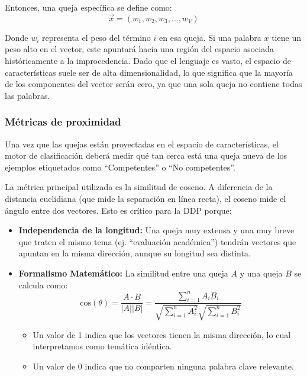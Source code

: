 Entonces, una queja específica se define como:
\begin{equation}
\vec{x} = (w_1, w_2, w_3, \dots, w_V)
\end{equation}

Donde $w_i$ representa el peso del término $i$ en esa queja. Si una palabra $x$ tiene un peso alto en el vector, este apuntará hacia una región del espacio asociada históricamente  a la improcedencia. Dado que el lenguaje es vasto, el espacio de características suele ser de alta dimensionalidad, lo que significa que la mayoría de los componentes del vector serán cero, ya que una sola queja no contiene todas las palabras.

\subsubsection{Métricas de proximidad}

Una vez que las quejas están proyectadas en el espacio de características, el motor de clasificación deberá medir qué tan cerca está una queja nueva de los ejemplos etiquetados como “Competentes” o “No competentes”.

La métrica principal utilizada es la similitud de coseno. A diferencia de la distancia euclidiana (que mide la separación en línea recta), el coseno mide el ángulo entre dos vectores. Esto es crítico para la DDP porque:

\begin{itemize}
\item \textbf{Independencia de la longitud:} Una queja muy extensa y una muy breve que traten el mismo tema (ej. “evaluación académica”) tendrán vectores que apuntan en la misma dirección, aunque su longitud sea distinta.
\item \textbf{Formalismo Matemático:} La similitud entre una queja $A$ y una queja $B$ se calcula como:
\begin{equation}
\text{cos}(\theta) = \frac{A \cdot B}{|A| |B|} = \frac{\sum_{i=1}^{n} A_i B_i}{\sqrt{\sum_{i=1}^{n} A_i^2} \sqrt{\sum_{i=1}^{n} B_i^2}}
\end{equation}
\begin{itemize}
\item Un valor de 1 indica que los vectores tienen la misma dirección, lo cual interpretamos como temática idéntica.
\item Un valor de 0 indica que no comparten ninguna palabra clave relevante.
\end{itemize}
\end{itemize}

